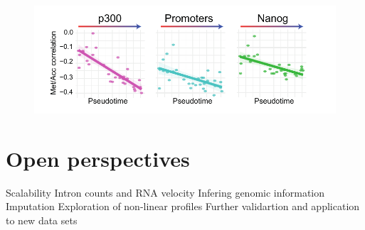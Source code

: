 \begin{figure}[H]
	\centering
	\includegraphics[width=0.9\linewidth]{scNMT_pseudotime_coupling}
	\caption[]{}
	\label{fig:scnmt_pseudotime_coupling}
\end{figure}

\section{Open perspectives}
Scalability
Intron counts and RNA velocity
Infering genomic information
Imputation 
Exploration of non-linear profiles
Further validartion and application to new data sets

